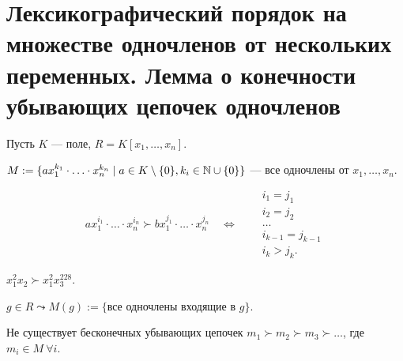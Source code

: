 \section{Лексикографический порядок на множестве одночленов от нескольких переменных. Лемма о конечности убывающих цепочек одночленов}
        
Пусть $K$ --- поле, $R = K[x_1, \dots, x_n]$.

$M := \{ax_1^{k_1} \cdot \ldots \cdot x_n^{k_n} \mid a \in K \setminus \{0\}, k_i \in \mathbb{N} \cup \{0\} \}$ --- все одночлены от $x_1, \dots, x_n$.

\begin{definition}
    \begin{equation*}
        a x_{1}^{i_1} \cdot \ldots \cdot x_n^{i_n} \succ b x_1^{j_1} \cdot \ldots \cdot x_n^{j_n} \quad \iff \quad 
        \begin{aligned}
            &i_1 = j_1 \\
            &i_2 = j_2 \\
                &\dots \\
                &i_{k - 1} = j_{k - 1} \\
                &i_k > j_k.
        \end{aligned}
    \end{equation*}
\end{definition}

\begin{example}
    $x_1^2 x_2 \succ x_1^2 x_3^{228}$.
\end{example}

\begin{comment}~
    \begin{enumerate}
    \item $m_1, m_2, m_3 \in M$, $m_1 \prec m_2 \implies m_1 m_3 \prec m_2 m_3$;
    \item $m_1, m_2, m_3 \in M$, $m_1 \prec m_2$, $m_2 \prec m_3 \implies m_1 \prec m_3$.
    \end{enumerate}
\end{comment}

\bigskip
$g \in R \leadsto M(g) := \{\text{все одночлены входящие в $g$}\}$.

\begin{lemma}
    Не существует бесконечных убывающих цепочек $m_1 \succ m_2 \succ m_3 \succ \dots$, где $m_i \in M \ \forall i$.
\end{lemma}

